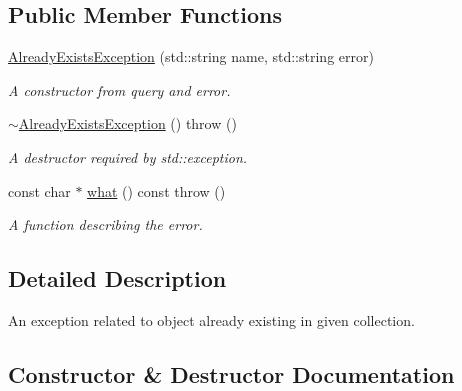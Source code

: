 \subsection*{Public Member Functions}
\begin{DoxyCompactItemize}
\item 
\hyperlink{class_r_c_f_1_1_common_1_1_already_exists_exception_a9ba822b6c209ce100cababc81b8a2dcb}{Already\+Exists\+Exception} (std\+::string name, std\+::string error)
\begin{DoxyCompactList}\small\item\em A constructor from query and error. \end{DoxyCompactList}\item 
\hypertarget{class_r_c_f_1_1_common_1_1_already_exists_exception_a6d162fa18122481b50f5994893497838}{}\hyperlink{class_r_c_f_1_1_common_1_1_already_exists_exception_a6d162fa18122481b50f5994893497838}{$\sim$\+Already\+Exists\+Exception} ()  throw ()\label{class_r_c_f_1_1_common_1_1_already_exists_exception_a6d162fa18122481b50f5994893497838}

\begin{DoxyCompactList}\small\item\em A destructor required by std\+::exception. \end{DoxyCompactList}\item 
const char $\ast$ \hyperlink{class_r_c_f_1_1_common_1_1_already_exists_exception_a8bbdb8cc649a303ac9e5547edc0c39e6}{what} () const   throw ()
\begin{DoxyCompactList}\small\item\em A function describing the error. \end{DoxyCompactList}\end{DoxyCompactItemize}


\subsection{Detailed Description}
An exception related to object already existing in given collection. 

\subsection{Constructor \& Destructor Documentation}
\hypertarget{class_r_c_f_1_1_common_1_1_already_exists_exception_a9ba822b6c209ce100cababc81b8a2dcb}{}
